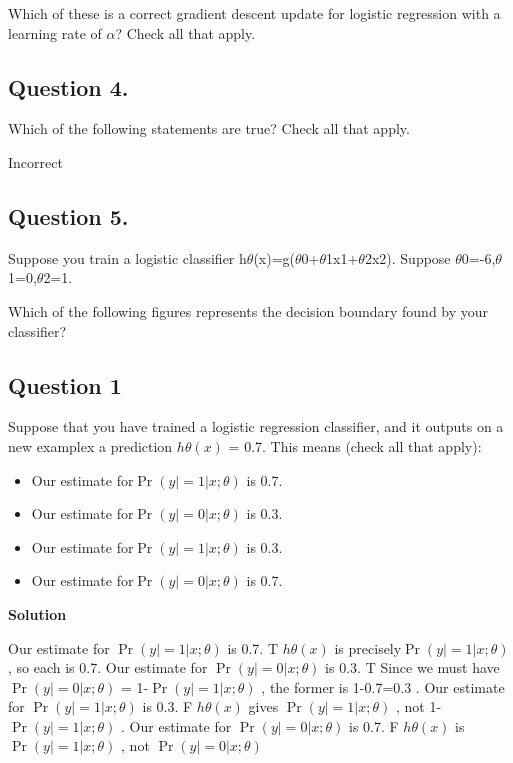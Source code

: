 \documentclass[11pt]{article} %
\begin{document}
	
	Which of these is a correct gradient descent update for logistic regression with a learning rate of $\alpha$? Check all that apply.
	
	
	\subsection{Question 4. }
	Which of the following statements are true? Check all that apply.
	
	Incorrect
	\subsection{Question 5. }
	Suppose you train a logistic classifier h$\theta$(x)=g($\theta$0+$\theta$1x1+$\theta$2x2). 
	Suppose $\theta$0=-6,$\theta$1=0,$\theta$2=1. 
	
	Which of the following figures represents the decision boundary found by your classifier?
	


\subsection{Question 1}

Suppose that you have trained a logistic regression classifier, and it outputs on a new examplex a prediction $h\theta(x)$ = 0.7.
This means (check all that apply): 
\begin{itemize}
\item Our estimate for$ \Pr(y|=1|x;\theta)$ is 0.7.
\item Our estimate for$ \Pr(y|=0|x;\theta)$ is 0.3.
\item Our estimate for$ \Pr(y|=1|x;\theta)$ is 0.3.
\item Our estimate for$ \Pr(y|=0|x;\theta)$ is 0.7.
\end{itemize}


\textbf{Solution} 

Our estimate for $ \Pr(y|=1|x;\theta)$ is 0.7.  T
 $h\theta(x)$ is precisely$ \Pr(y|=1|x;\theta)$ , so each is 0.7.
Our estimate for $ \Pr(y|=0|x;\theta)$ is 0.3.  
T Since we must have $ \Pr(y|=0|x;\theta)$ = 1-$ \Pr(y|=1|x;\theta)$ , the former is 1-0.7=0.3 .
Our estimate for $ \Pr(y|=1|x;\theta)$ is 0.3.  
F $h\theta(x)$ gives $ \Pr(y|=1|x;\theta)$ , not 1-$ \Pr(y|=1|x;\theta)$ . 
Our estimate for $ \Pr(y|=0|x;\theta)$ is 0.7.  
F $h\theta(x)$ is $ \Pr(y|=1|x;\theta)$ , not $ \Pr(y|=0|x;\theta)$ 
\end{document}
